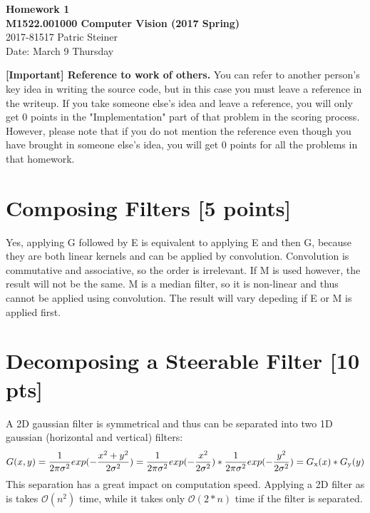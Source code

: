 \documentclass[12pt,a4paper]{article}
\begin{document}
\begin{center}
    {\bf\large Homework 1} \\
    {\bf\large M1522.001000 Computer Vision (2017 Spring)} \\
    2017-81517 Patric Steiner \\
    Date: March 9 Thursday
\end{center}

\textbf{[Important] Reference to work of others.} You can refer to another person's key idea in writing the source code, but in this case you must leave a reference in the writeup. If you take someone else's idea and leave a reference, you will only get 0 points in the "Implementation" part of that problem in the scoring process. 
However, please note that if you do not mention the reference even though you have brought in someone else's idea, you will get 0 points for all the problems in that homework.




\section{Composing Filters [5 points]}

Yes, applying G followed by E is equivalent to applying E and then G, because they are both linear kernels and can be applied by convolution. Convolution is commutative and associative, so the order is irrelevant.
If M is used however, the result will not be the same. M is a median filter, so it is non-linear and thus cannot be applied using convolution. The result will vary depeding if E or M is applied first.

\section{Decomposing a Steerable Filter [10 pts]}

A 2D gaussian filter is symmetrical and thus can be separated into two 1D gaussian (horizontal and vertical) filters:
\begin{equation}
    G(x,y) = \frac{1}{2\pi\sigma^2} exp(-\frac{x^2+y^2}{2\sigma^2}) \\
    = \frac{1}{2\pi\sigma^2} exp(-\frac{x^2}{2\sigma^2}) * \frac{1}{2\pi\sigma^2} exp(-\frac{y^2}{2\sigma^2}) \\
    = G\textsubscript{x}(x) * G\textsubscript{y}(y)
\end{equation}
This separation has a great impact on computation speed. Applying a 2D filter as is takes $\mathcal{O}(n^2)$ time, while it takes only $\mathcal{O}(2*n)$ time if the filter is separated.
\end{document}
